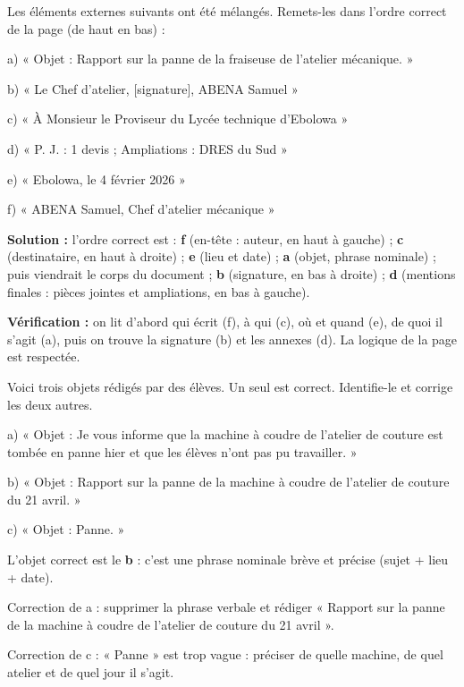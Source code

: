 \documentclass[11pt]{article}
\newcounter{popsec}
\newcounter{popsub}
\newcommand{\courssub}[1]{%
  \stepcounter{popsub}%
  \par\vspace{9pt}\noindent{\popxbold\fontsize{11.5}{13}\selectfont\color{popink}{\color{poporange}\thepopsec.\thepopsub}\hspace{6pt}#1}\par\nopagebreak\vspace{4pt}
}
\begin{document}
\courssub{Exercices d'application}

\begin{exoresolu}
Les éléments externes suivants ont été mélangés. Remets-les dans l'ordre correct de la page (de haut en bas) :\par
a) « Objet : Rapport sur la panne de la fraiseuse de l'atelier mécanique. »\par
b) « Le Chef d'atelier, [signature], ABENA Samuel »\par
c) « À Monsieur le Proviseur du Lycée technique d'Ebolowa »\par
d) « P. J. : 1 devis ; Ampliations : DRES du Sud »\par
e) « Ebolowa, le 4 février 2026 »\par
f) « ABENA Samuel, Chef d'atelier mécanique »\par
\tcblower
\textbf{Solution :} l'ordre correct est : \textbf{f} (en-tête : auteur, en haut à gauche) ; \textbf{c} (destinataire, en haut à droite) ; \textbf{e} (lieu et date) ; \textbf{a} (objet, phrase nominale) ; puis viendrait le corps du document ; \textbf{b} (signature, en bas à droite) ; \textbf{d} (mentions finales : pièces jointes et ampliations, en bas à gauche).\par
\textbf{Vérification :} on lit d'abord qui écrit (f), à qui (c), où et quand (e), de quoi il s'agit (a), puis on trouve la signature (b) et les annexes (d). La logique de la page est respectée.
\end{exoresolu}

\begin{exercice}
Voici trois objets rédigés par des élèves. Un seul est correct. Identifie-le et corrige les deux autres.\par
a) « Objet : Je vous informe que la machine à coudre de l'atelier de couture est tombée en panne hier et que les élèves n'ont pas pu travailler. »\par
b) « Objet : Rapport sur la panne de la machine à coudre de l'atelier de couture du 21 avril. »\par
c) « Objet : Panne. »
\end{exercice}

\begin{corrige}
L'objet correct est le \textbf{b} : c'est une phrase nominale brève et précise (sujet + lieu + date).\par
Correction de a : supprimer la phrase verbale et rédiger « Rapport sur la panne de la machine à coudre de l'atelier de couture du 21 avril ».\par
Correction de c : « Panne » est trop vague : préciser de quelle machine, de quel atelier et de quel jour il s'agit.
\end{corrige}
\end{document}
